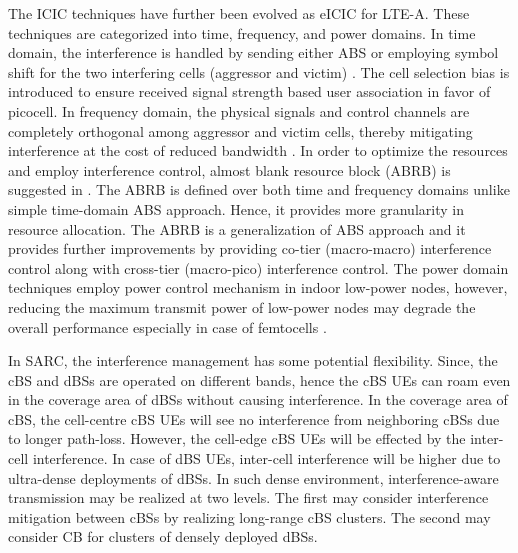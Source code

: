 \documentclass[article,10pt,twocolumn]{IEEEtran}
\begin{document}
The ICIC techniques have further been evolved as eICIC for LTE-A. These techniques are categorized into time, frequency, and power domains. In time domain, the interference is handled by sending either ABS or employing symbol shift for the two interfering cells (aggressor and victim) \citep{6475212}. The cell selection bias is introduced to ensure received signal strength based user association in favor of picocell. In frequency domain, the physical signals and control channels are completely orthogonal among aggressor and victim cells, thereby mitigating interference at the cost of reduced bandwidth \citep{D_Lopez2011}. In order to optimize the resources and employ interference control, almost blank resource block (ABRB)  is suggested in \citep{6725662}. The ABRB is defined over both time and frequency domains unlike simple time-domain ABS approach. Hence, it provides more granularity in resource allocation. The ABRB is a generalization of ABS approach and it provides further improvements by providing co-tier (macro-macro) interference control along with cross-tier (macro-pico) interference control. The power domain techniques employ power control mechanism in indoor low-power nodes, however, reducing the maximum transmit power of low-power nodes may degrade the overall performance especially in case of femtocells \citep{6392819}.

In SARC, the interference management has some potential flexibility. Since, the cBS and dBSs are operated on different bands, hence the cBS UEs can roam even in the coverage area of dBSs without causing interference. In the coverage area of cBS, the cell-centre cBS UEs will see no interference from neighboring cBSs due to longer path-loss. However, the cell-edge cBS UEs will be effected by the inter-cell interference. In case of dBS UEs, inter-cell interference will be higher due to ultra-dense deployments of dBSs. In such dense environment, interference-aware transmission may be realized at two levels. The first may consider interference mitigation between cBSs by realizing long-range cBS clusters. The second may consider CB for clusters of densely deployed dBSs.
\end{document}
